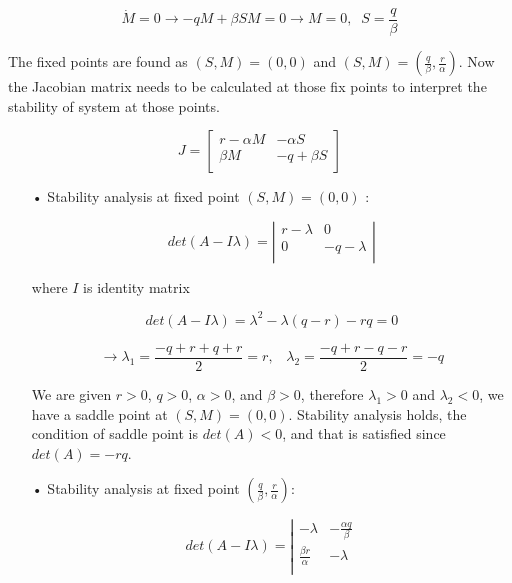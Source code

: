 \documentclass[12pt]{article}
\begin{document}
\begin{equation*}
\dot{M} = 0 \longrightarrow -qM + \beta SM = 0 \longrightarrow M =0, \;\; S=\frac{q}{\beta} 
\end{equation*}

The fixed points are found as $(S,M)=(0,0)$ and $(S,M)=(\frac{q}{\beta} ,\frac{r}{\alpha})$. Now the Jacobian matrix needs to be calculated at those fix points to interpret the stability of system at those points. 

\[
J=
\left[ {\begin{array}{cc }
r- \alpha M   &  -\alpha S \\
\beta M &  -q + \beta S  \\

\end{array} } \right]
\]

\begin{itemize}
\item[•] Stability analysis at fixed point $(S,M)=(0,0)$ :

\[
det(A -     I \lambda )= 
\left| {\begin{array}{cc }
r- \lambda   &  0 \\
0 &  -q-\lambda  \\

\end{array} } \right|
\] 

where $I$ is identity matrix


\begin{equation*}
det(A -     I \lambda ) = \lambda^{2} - \lambda (q-r) - rq = 0 
\end{equation*}


\begin{equation*}
 \longrightarrow \lambda_1 = \frac{-q+r+q+r}{2} = r, \;\;\; \lambda_2 = \frac{-q+r-q-r}{2} = -q
\end{equation*}

We are given $r>0$, $q>0$, $\alpha > 0$, and $\beta > 0$, therefore $\lambda_1 > 0 $ and $\lambda_2 <0$, we have a saddle point at $(S,M)=(0,0)$. Stability analysis holds, the condition of saddle point is $det(A)<0$, and that is satisfied since $det(A)=-rq$.

\item[•] Stability analysis at fixed point $(\frac{q}{\beta} ,\frac{r}{\alpha})$:


\[
det(A -     I \lambda )= 
\left| {\begin{array}{cc }
-\lambda   &  - \frac{\alpha q}{\beta} \\
\frac{ \beta r}{\alpha} &  -\lambda  \\


\end{array}}\]
\end{itemize}
\end{document}
